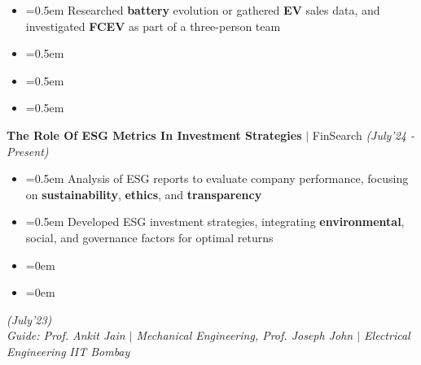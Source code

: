 \documentclass{article}
\begin{document}
\vspace{-5pt}
\begin{itemize}[label=\textcolor{myblue}{\textbullet},itemsep = -1.25mm, leftmargin=5.5mm]
 
\item{}\font=0.5em Researched \textbf{battery} evolution or gathered \textbf{EV} sales data, and investigated \textbf{FCEV} as part of a three-person team
\item{}\font=0.5em 
\item{}\font=0.5em 
\item{}\font=0.5em 
\end{itemize}
{\fontsize{12}{12} \textbf{The Role Of ESG Metrics In Investment Strategies} $|$ FinSearch}  \hfill{\sl \small (July'24 - Present)}
\vspace{-7pt}
\begin{itemize}[label=\textcolor{myblue}{\textbullet},itemsep = -1.25mm, leftmargin=5.5mm]
\item{}\font=0.5em Analysis of ESG reports to evaluate company performance, focusing on \textbf{sustainability}, \textbf{ethics}, and \textbf{transparency}
\item{}\font=0.5em Developed ESG investment strategies, integrating \textbf{environmental}, social, and governance factors for optimal returns
\item{}\font=0em 
 
\item{}\font=0em 
\end{itemize}
  \hfill{\sl \small (July'23)}\\
{\it Guide: Prof. Ankit Jain $|$ Mechanical Engineering, Prof. Joseph John $|$  Electrical Engineering } \hfill{\it IIT Bombay}\hspace{-2pt}
 
\end{document}
